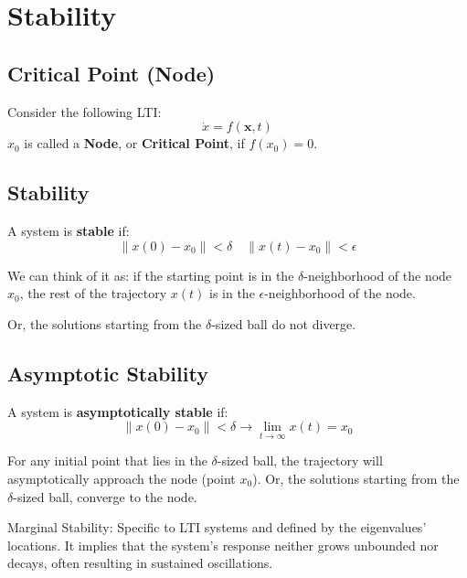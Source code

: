 
\section{Stability}


\subsection{Critical Point (Node)}

\begin{tcolorbox}[colback=green!10,colframe=green!50!black,title=\textbf{Critical Point (Node)}]
Consider the following LTI:
\[
\dot{x} = f(\mathbf{x}, t)
\]
\(x_0\) is called a \textbf{Node}, or \textbf{Critical Point}, if \(f(x_0) = 0\).
\end{tcolorbox}

\subsection{Stability}
\begin{tcolorbox}
A system is \textbf{stable} if:
\[
\|x(0) - x_0 \| < \delta \quad \| x(t) -x_0\| < \epsilon
\]
\end{tcolorbox}

We can think of it as: if the starting point is in the $\delta$-neighborhood of the node $x_0$, 
the rest of the trajectory $x(t)$ is in the $\epsilon$-neighborhood of the node.

Or, the solutions starting from the $\delta$-sized ball do not diverge. 

\subsection*{Asymptotic Stability}

\begin{tcolorbox}
A system is \textbf{asymptotically stable} if:
\[
\|x(0) - x_0 \| < \delta \to \lim_{t \to \infty} x(t) = x_0 
\]
\end{tcolorbox}

For any initial point that lies in the \(\delta\)-sized ball, the trajectory will asymptotically approach the node (point $x_0$).
Or, the solutions starting from the \(\delta\)-sized ball, converge to the node. 

Marginal Stability: Specific to LTI systems and defined by the eigenvalues' locations. It implies that the system's response neither grows unbounded nor decays, often resulting in sustained oscillations.



